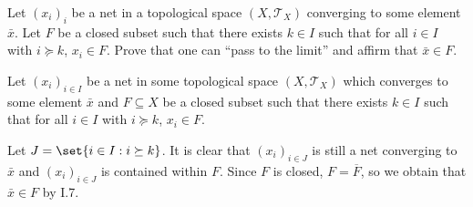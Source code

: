 \documentclass[10pt]{mypackage}
\begin{document}
\begin{problem}[Problem I.8]
  Let $\left( x_i \right)_i$ be a net in a topological space $\left( X,\mathcal{T}_X \right)$ converging to some element $\bar{x}$. Let $F$ be a closed subset such that there exists $k\in I$ such that for all $i\in I$ with $i\succeq k$, $x_i\in F$. Prove that one can ``pass to the limit'' and affirm that $\bar{x}\in F$.
\end{problem}
\begin{solution}
Let $\left(x_i\right)_{i\in I}$ be a net in some topological space $\left(X,\mathcal T_X\right)$ which converges to some element $\bar x$ and $F\subseteq X$ be a closed subset such that there exists $k \in I$ such that for all $ i\in I$ with $i\succeq k $,  $ x_i\in F$.

Let $J = \set{i\in I : i \succeq k}$. It is clear that $\left(x_i\right)_{i\in J}$ is still a net converging to $\bar x$ and $\left(x_i\right)_{i\in J}$ is contained within $F$. Since $F$ is closed, $F = \overline{F}$, so we obtain that $\bar x \in F$ by I.7.
\end{solution}
\end{document}
